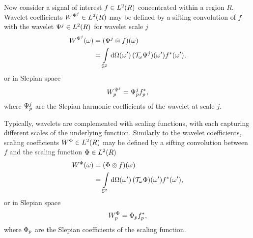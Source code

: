 Now consider a signal of interest \(f \in \hilbert{R}\) concentrated within a region \(R\).
Wavelet coefficients \(W^{\Psi^{j}} \in \hilbert{R}\) may be defined by a sifting convolution of \(f\) with the wavelet \(\Psi^{j} \in \hilbert{R}\) for wavelet scale \(j\)
%
\begin{align}\label{eq:chapter4_slepian_wavelet_omega}
	\pixel{W^{\Psi^{j}}}
	 & = \pixel{\convolution{\Psi^{j}}{f}} \nonumber                                              \\
	 & = \integrateSphere{\omega'} \pixel[']{(\translation{\omega}\Psi^{j})} \pixel[']{\conj{f}},
\end{align}
%
or in Slepian space
%
\begin{equation}\label{eq:chapter4_slepian_wavelet_p}
	\slepian{W}^{\Psi^{j}}
	= \slepian{\Psi}^{j} \conj{\slepian{f}},
\end{equation}
%
where \(\slepian{\Psi}^{j}\) are the Slepian harmonic coefficients of the wavelet at scale \(j\).

Typically, wavelets are complemented with scaling functions, with each capturing different scales of the underlying function.
Similarly to the wavelet coefficients, scaling coefficients \(W^{\Phi} \in \hilbert{R}\) may be defined by a sifting convolution between \(f\) and the scaling function \(\Phi \in \hilbert{R}\)
%
\begin{align}\label{eq:chapter4_slepian_scaling_omega}
	\pixel{W^{\Phi}}
	 & = \pixel{\convolution{\Phi}{f}} \nonumber                                              \\
	 & = \integrateSphere{\omega'} \pixel[']{(\translation{\omega}\Phi)} \pixel[']{\conj{f}},
\end{align}
%
or in Slepian space
%
\begin{equation}\label{eq:chapter4_slepian_scaling_p}
	\slepian{W}^{\Phi}
	= \slepian{\Phi} \conj{\slepian{f}},
\end{equation}
%
where \(\slepian{\Phi}\) are the Slepian coefficients of the scaling function.

